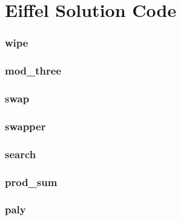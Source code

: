 \section{Eiffel Solution Code}\label{eiffel_code_solution}

\subsubsection{wipe}\label{eiffel_code_wipe_solution}

\pagebreak
\subsubsection{mod\_three}\label{eiffel_code_mod_three_solution}

\pagebreak
\subsubsection{swap}\label{eiffel_code_swap_solution}

\pagebreak
\subsubsection{swapper}\label{eiffel_code_swapper_solution}

\pagebreak
\subsubsection{search}\label{eiffel_code_search_solution}

\pagebreak
\subsubsection{prod\_sum}\label{eiffel_code_prod_sum_solution}

\pagebreak
\subsubsection{paly}\label{eiffel_code_paly_solution}

\pagebreak